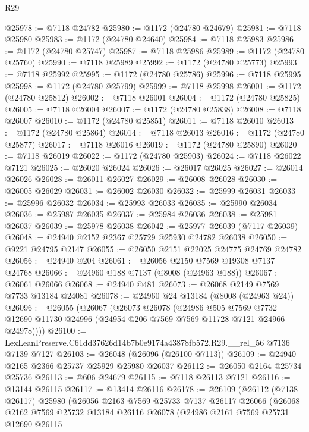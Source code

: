 \begin{lexlean}{R29}
\begin{coremodule}
@25978 := @7118 @24782
@25980 := @1172 (@24780 @24679)
@25981 := @7118 @25980
@25983 := @1172 (@24780 @24640)
@25984 := @7118 @25983
@25986 := @1172 (@24780 @25747)
@25987 := @7118 @25986
@25989 := @1172 (@24780 @25760)
@25990 := @7118 @25989
@25992 := @1172 (@24780 @25773)
@25993 := @7118 @25992
@25995 := @1172 (@24780 @25786)
@25996 := @7118 @25995
@25998 := @1172 (@24780 @25799)
@25999 := @7118 @25998
@26001 := @1172 (@24780 @25812)
@26002 := @7118 @26001
@26004 := @1172 (@24780 @25825)
@26005 := @7118 @26004
@26007 := @1172 (@24780 @25838)
@26008 := @7118 @26007
@26010 := @1172 (@24780 @25851)
@26011 := @7118 @26010
@26013 := @1172 (@24780 @25864)
@26014 := @7118 @26013
@26016 := @1172 (@24780 @25877)
@26017 := @7118 @26016
@26019 := @1172 (@24780 @25890)
@26020 := @7118 @26019
@26022 := @1172 (@24780 @25903)
@26024 := @7118 @26022 @7121
@26025 := @26020 @26024
@26026 := @26017 @26025
@26027 := @26014 @26026
@26028 := @26011 @26027
@26029 := @26008 @26028
@26030 := @26005 @26029
@26031 := @26002 @26030
@26032 := @25999 @26031
@26033 := @25996 @26032
@26034 := @25993 @26033
@26035 := @25990 @26034
@26036 := @25987 @26035
@26037 := @25984 @26036
@26038 := @25981 @26037
@26039 := @25978 @26038
@26042 := @25977 @26039 (@7117 @26039)
@26048 := @24940 @2152 @2367 @25729 @25930 @24782 @26038
@26050 := @9221 @24795 @2147
@26055 := @26050 @2151 @22025 @24775 @24769 @24782
@26056 := @24940 @204
@26061 := @26056 @2150 @7569 @19308 @7137 @24768
@26066 := @24960 @188 @7137 (@8008 (@24963 @188))
@26067 := @26061 @26066
@26068 := @24940 @481
@26073 := @26068 @2149 @7569 @7733 @13184 @24081
@26078 := @24960 @24 @13184 (@8008 (@24963 @24))
@26096 := @26055
    (@26067
      (@26073
        @26078
        (@24986
          @505
          @7569
          @7732
          @12690
          @11730
          @24996
          (@24954 @206 @7569 @7569 @11728 @7121 @24966 @24978))))
@26100 := LexLeanPreserve.C61dd37626d14b7b0e9174a43878fb572.R29.__rel_56 @7136 @7139 @7127
@26103 := @26048 (@26096 (@26100 @7113))
@26109 := @24940 @2165 @2366 @25737 @25929 @25980 @26037
@26112 := @26050 @2164 @25734 @25736
@26113 := @606 @24679
@26115 := @7118 @26113 @7121
@26116 := @13144 @26115
@26117 := @13414 @26116
@26178 := @26109
    (@26112
      (@7138 @26117)
      @25980
      (@26056
        @2163
        @7569
        @25733
        @7137
        @26117
        @26066
        (@26068
          @2162
          @7569
          @25732
          @13184
          @26116
          @26078
          (@24986
            @2161
            @7569
            @25731
            @12690
            @26115

\end{coremodule}
\end{lexlean}
